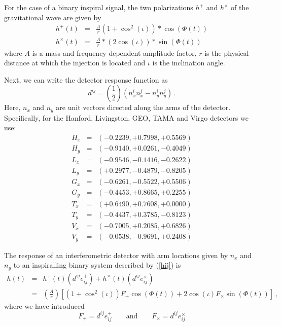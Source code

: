 \begin{entry}
For the case of a binary inspiral signal, the two polarizations $h^{+}$
and $h^{\times}$ of the gravitational wave are given by
%
\begin{eqnarray}
  h^{+}(t)  &=& \frac{A}{r}  ( 1 + \cos^2 ( \iota ) ) * \cos( \Phi(t) ) \\
  h^{\times}(t) &=& \frac{A}{r} * ( 2 \cos( \iota )   ) * \sin( \Phi(t) )
\end{eqnarray}
%    
where $A$ is a mass and frequency dependent amplitude factor, $r$ is the
physical distance at which the injection is located and $\iota$ is the
inclination angle.

Next, we can write the detector response function as
%
\begin{equation}
  d^{ij} = \left(\frac{1}{2} \right) \left( n_{x}^{i} n_{x}^{j} 
      - n_{y}^{i} n_{y}^{j} \right) \, .
\end{equation}
%
Here, $n_{x}$ and $n_{y}$ are unit vectors directed along the arms of the
detector.  Specifically, for the Hanford, Livingston, GEO, TAMA and Virgo
detectors we use:
%
\begin{eqnarray}
  H_{x} &=& ( -0.2239, +0.7998, +0.5569 ) \nonumber \\
  H_{y} &=& ( -0.9140, +0.0261, -0.4049 ) \\
  L_{x} &=& ( -0.9546, -0.1416, -0.2622 ) \nonumber \\
  L_{y} &=& ( +0.2977, -0.4879, -0.8205 ) \\
  G_{x} &=& ( -0.6261, -0.5522, +0.5506 ) \nonumber \\
  G_{y} &=& ( -0.4453, +0.8665, +0.2255 ) \\
  T_{x} &=& ( +0.6490, +0.7608, +0.0000 ) \nonumber \\
  T_{y} &=& ( -0.4437, +0.3785, -0.8123 ) \label{tarm} \\
  V_{x} &=& ( -0.7005, +0.2085, +0.6826 ) \nonumber \\
  V_{y} &=& ( -0.0538, -0.9691, +0.2408 )
\end{eqnarray} 
%

The response of an interferometric detector with arm locations given by $n_{x}$
and $n_{y}$ to an inspiralling binary system described by (\ref{hij}) is
%
\begin{eqnarray}
  h(t) &=& h^{+}(t) ( d^{ij} e^{+}_{ij} ) 
    + h^{\times}(t) ( d^{ij} e^{\times}_{ij} ) \nonumber \\
      &=& 
    \left(\frac{A}{r}\right) \left[  
	( 1 + \cos^2 ( \iota ) ) F_{+} \cos( \Phi(t)) + 
        2 \cos( \iota ) F_{\times} \sin( \Phi(t) ) \right] \, ,
\end{eqnarray}
%
where we have introduced
%
\begin{equation}
  F_{+} = d^{ij} e^{+}_{ij} \qquad \mathrm{and} \qquad  
  F_{\times} = d^{ij} e^{\times}_{ij}
\end{equation}
%  


\end{entry}
